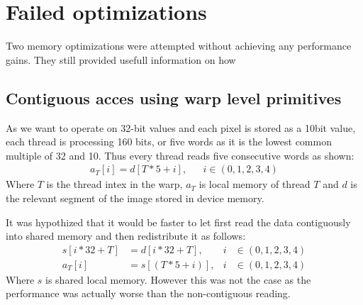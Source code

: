 \section{Failed optimizations}
Two memory optimizations were attempted without achieving any performance gains.
They still provided usefull information on how

\subsection{Contiguous acces using warp level primitives} \label{sec:contuguous_access}
As we want to operate on 32-bit values and each pixel is stored as a 10bit value, each thread is processing 160 bits, or five words as it is the lowest common multiple of 32 and 10.
Thus every thread reads five consecutive words as shown:
\begin{align}
    a_T[i] = d[T*5+i], &  & i \in (0,1,2,3,4)
\end{align}
Where $T$ is the thread intex in the warp, $a_T$ is local memory of thread $T$ and $d$ is the relevant segment of the image stored in device memory.

It was hypothized that it would be faster to let first read the data contiguously into shared memory and then redistribute it as follows:
\begin{align}
    s[i*32+T] & = d[i*32+T],  & i & \in (0,1,2,3,4) \\
    a_T[i]    & = s[(T*5+i)], & i & \in (0,1,2,3,4)
    \label{eq:contiguous_reading}
\end{align}
Where $s$ is shared local memory.
However this was not the case as the performance was actually worse than the non-contiguous reading.


